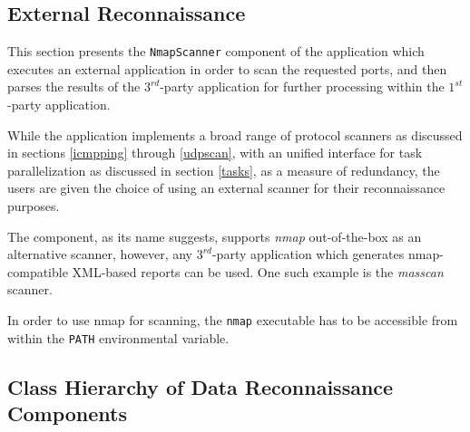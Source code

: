 \documentclass[a4paper,12pt]{article}
\begin{document}
\subsection{External Reconnaissance} \label{nmapscan}
 

	This section presents the \texttt{NmapScanner} component of the application which executes an external application in order to scan the requested ports, and then parses the results of the $3^{rd}$-party application for further processing within the $1^{st}$-party application.
	
	While the application implements a broad range of protocol scanners as discussed in sections \ref{icmpping} through \ref{udpscan}, with an unified interface for task parallelization as discussed in section \ref{tasks}, as a measure of redundancy, the users are given the choice of using an external scanner for their reconnaissance purposes.
	
	The component, as its name suggests, supports \textit{nmap} out-of-the-box as an alternative scanner, however, any $3^{rd}$-party application which generates nmap-compatible XML-based reports can be used. One such example is the \textit{masscan} scanner.
	
	In order to use nmap for scanning, the \texttt{nmap} executable has to be accessible from within the \texttt{PATH} environmental variable.

\newpage
\subsection{Class Hierarchy of Data Reconnaissance Components}
 
\end{document}
